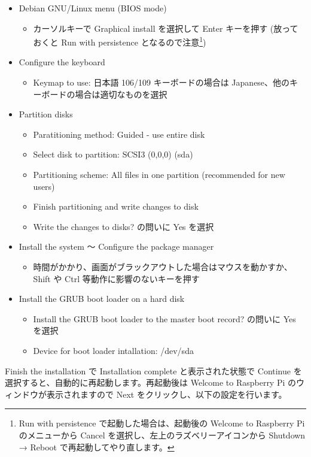 \documentclass[a4j,oneside]{ujbook}
\begin{document}
\begin{itemize}
 \item Debian GNU/Linux menu (BIOS mode)
 \begin{itemize}
  \item カーソルキーで Graphical install を選択して Enter キーを押す (放っておくと Run with persistence となるので注意\footnote{Run with persistence で起動した場合は、起動後の Welcome to Raspberry Pi のメニューから Cancel を選択し、左上のラズベリーアイコンから Shutdown → Reboot で再起動してやり直します。})
 \end{itemize}
 \item Configure the keyboard
 \begin{itemize}
  \item Keymap to use: 日本語 106/109 キーボードの場合は Japanese、他のキーボードの場合は適切なものを選択
 \end{itemize}
 \item Partition disks
 \begin{itemize}
  \item Paratitioning method: Guided - use entire disk
  \item Select disk to partition: SCSI3 (0,0,0) (sda)
  \item Partitioning scheme: All files in one partition (recommended for new users)
  \item Finish partitioning and write changes to disk
  \item Write the changes to disks? の問いに Yes を選択
 \end{itemize}
 \item Install the system 〜 Configure the package manager
 \begin{itemize}
  \item 時間がかかり、画面がブラックアウトした場合はマウスを動かすか、 Shift や Ctrl 等動作に影響のないキーを押す
 \end{itemize}
 \item Install the GRUB boot loader on a hard disk
 \begin{itemize}
  \item Install the GRUB boot loader to the master boot record? の問いに Yes を選択
  \item Device for boot loader intallation: /dev/sda
 \end{itemize}
\end{itemize}

Finish the installation で Installation complete と表示された状態で Continue を選択すると、自動的に再起動します。再起動後は Welcome to Raspberry Pi のウィンドウが表示されますので Next をクリックし、以下の設定を行います。
\end{document}
